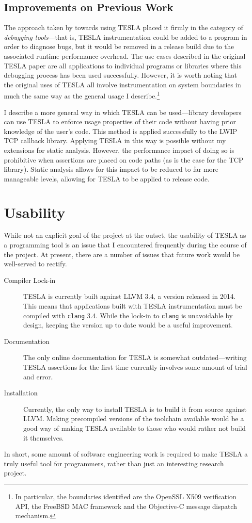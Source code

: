 \subsection{Improvements on Previous Work}

The approach taken by \textcite{anderson_tesla:_2014} towards using TESLA placed
it firmly in the category of \emph{debugging tools}---that is, TESLA
instrumentation could be added to a program in order to diagnose bugs, but it
would be removed in a release build due to the associated runtime performance
overhead. The use cases described in the original TESLA paper are all
applications to individual programs or libraries where this debugging process
has been used successfully. However, it is worth noting that the original uses
of TESLA all involve instrumentation on system boundaries in much the same way
as the general usage I describe.\footnote{In particular, the boundaries
identified are the OpenSSL X509 verification API, the FreeBSD MAC framework and
the Objective-C message dispatch mechanism.}

I describe a more general way in which TESLA can be used---library developers
can use TESLA to enforce usage properties of their code without having prior
knowledge of the user's code. This method is applied successfully to the LWIP
TCP callback library. Applying TESLA in this way is possible
without my extensions for static analysis. However, the performance impact of
doing so is prohibitive when assertions are placed on  code paths
(as is the case for the TCP library). Static analysis allows for this impact to
be reduced to far more manageable levels, allowing for TESLA to be applied to
release code.

\section{Usability}

While not an explicit goal of the project at the outset, the usability of TESLA
as a programming tool is an issue that I encountered frequently during the
course of the project. At present, there are a number of issues that future work
would be well-served to rectify.
\begin{description}
  \item[Compiler Lock-in] TESLA is currently built against LLVM 3.4, a version
  released in 2014. This means that applications built with TESLA
  instrumentation must be compiled with \texttt{clang} 3.4. While the lock-in to
  \texttt{clang} is unavoidable by design, keeping the version up to date would
  be a useful improvement.
  
  \item[Documentation] The only online documentation for TESLA is somewhat
  outdated---writing TESLA assertions for the first time currently involves some
  amount of trial and error.

  \item[Installation] Currently, the only way to install TESLA is to build it
  from source against LLVM. Making precompiled versions of the toolchain
  available would be a good way of making TESLA available to those who would
  rather not build it themselves.
\end{description}

In short, some amount of software engineering work is required to make TESLA a
truly useful tool for programmers, rather than just an interesting research
project.
